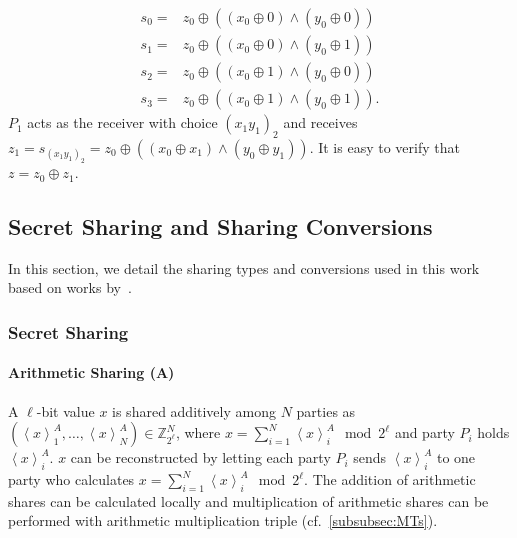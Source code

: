 \begin{equation}
    \begin{split}
        s_0=& z_{0} \oplus\left(\left(x_{0}\oplus 0 \right) \land \left(y_{0}\oplus 0\right) \right) \\
        s_{1}= & z_{0} \oplus\left(\left(x_{0}\oplus 0\right)  \land\left(y_{0} \oplus 1\right)\right) \\
        s_{2}= & z_{0} \oplus\left(\left(x_{0} \oplus 1\right) \land \left(y_{0}\oplus 0\right) \right) \\
        s_{3}=&z_{0} \oplus\left(\left(x_{0} \oplus 1\right) \land\left(y_{0} \oplus 1\right)\right) .
    \end{split}
\end{equation}
$P_1$ acts as the receiver with choice $\left(x_1y_1\right)_2 $ and receives $z_1=s_{\left(x_1y_1\right)_2 }=z_0\oplus \left(\left(x_0\oplus x_1\right)  \land \left(y_0\oplus  y_1\right)  \right)$. It is easy to verify that $z=z_0 \oplus z_1 $.


\subsection{Secret Sharing and Sharing Conversions}
\label{subsec:secretSharingAndSharingConversions}
In this section, we detail the sharing types and conversions used in this work based on works by~\cite{DSZ15}.

\subsubsection{Secret Sharing}

\paragraph{Arithmetic Sharing (A)}
\label{para:arithmeticSharing}
A $\ell$-bit value $x$ is shared additively among $N$ parties as $\left(\left\langle x\right\rangle ^A_1, \ldots,\left\langle x\right\rangle ^A_N \right) \in \mathbb{Z} ^N_{2^{\ell}}$, where $x=\sum_{i=1}^{N} \left\langle x\right\rangle^A_i \mod{2^{\ell}} $ and party $P_i$ holds $\left\langle x\right\rangle^A_i $. $x$ can be reconstructed by letting each party $P_i$ sends $\left\langle x\right\rangle^A_i $ to one party who calculates $x=\sum_{i=1}^{N} \left\langle x\right\rangle^A_i \mod{2^{\ell}}$. The addition of arithmetic shares can be calculated locally and multiplication of arithmetic shares can be performed with arithmetic multiplication triple (cf.~\autoref{subsubsec:MTs}).

